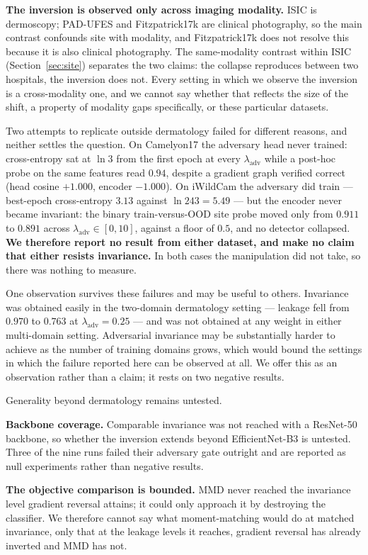 \documentclass[11pt,a4paper]{article}
\newcommand{\lam}{\lambda_{\mathrm{adv}}}
\begin{document}
\textbf{The inversion is observed only across imaging modality.} ISIC is dermoscopy;
PAD-UFES and Fitzpatrick17k are clinical photography, so the main contrast confounds
site with modality, and Fitzpatrick17k does not resolve this because it is also
clinical photography. The same-modality contrast within ISIC
(Section~\ref{sec:site}) separates the two claims: the collapse reproduces between two
hospitals, the inversion does not. Every setting in which we observe the inversion is a
cross-modality one, and we cannot say whether that reflects the size of the shift, a
property of modality gaps specifically, or these particular datasets.

Two attempts to replicate outside dermatology failed for different reasons, and
neither settles the question. On Camelyon17 the adversary head never trained:
cross-entropy sat at $\ln 3$ from the first epoch at every $\lam$ while a
post-hoc probe on the same features read $0.94$, despite a gradient graph
verified correct (head cosine $+1.000$, encoder $-1.000$). On iWildCam the
adversary did train --- best-epoch cross-entropy $3.13$ against $\ln 243 =
5.49$ --- but the encoder never became invariant: the binary train-versus-OOD
site probe moved only from $0.911$ to $0.891$ across $\lam \in [0, 10]$, against
a floor of $0.5$, and no detector collapsed. \textbf{We therefore report no
result from either dataset, and make no claim that either resists invariance.}
In both cases the manipulation did not take, so there was nothing to measure.

One observation survives these failures and may be useful to others. Invariance
was obtained easily in the two-domain dermatology setting --- leakage fell from
$0.970$ to $0.763$ at $\lam = 0.25$ --- and was not obtained at any weight in
either multi-domain setting. Adversarial invariance may be substantially harder
to achieve as the number of training domains grows, which would bound the
settings in which the failure reported here can be observed at all. We offer
this as an observation rather than a claim; it rests on two negative results.

Generality beyond dermatology remains untested.

\textbf{Backbone coverage.} Comparable invariance was not reached with a ResNet-50
backbone, so whether the inversion extends beyond EfficientNet-B3 is untested. Three of
the nine runs failed their adversary gate outright and are reported as null experiments
rather than negative results.

\textbf{The objective comparison is bounded.} MMD never reached the invariance
level gradient reversal attains; it could only approach it by destroying the
classifier. We therefore cannot say what moment-matching would do at matched
invariance, only that at the leakage levels it reaches, gradient reversal has
already inverted and MMD has not.
\end{document}
